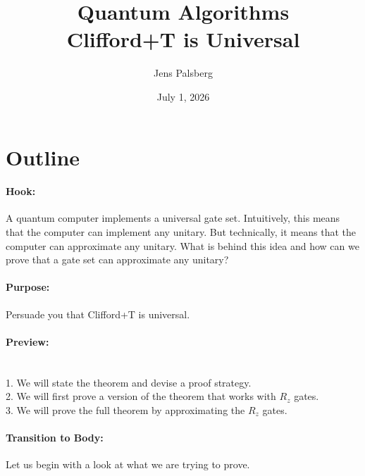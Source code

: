 \documentclass[11pt]{article}
\title{Quantum Algorithms \\
       Clifford+T is Universal}
\author{Jens Palsberg}
\date{July 1, 2026}
\begin{document}
\maketitle


\newpage


\vspace*{-1.2cm}

\section*{Outline}

\paragraph{Hook:} 
A quantum computer implements a universal gate set.
Intuitively, this means that the computer can implement any unitary. 
But technically, it means that the computer can approximate any unitary.
What is behind this idea and how can we prove that 
a gate set can approximate any unitary?

\paragraph{Purpose:} Persuade you that Clifford+T is universal.

\paragraph{Preview:} \mbox{} \\
\hspace*{1cm}
1. We will state the theorem and devise a proof strategy.
\\
\hspace*{1cm}
2. We will first prove a version of the theorem that works with $R_z$ gates.
\\
\hspace*{1cm}
3. We will prove the full theorem by approximating the $R_z$ gates.

\paragraph{Transition to Body:} 
Let us begin with a look at what we are trying to prove.
\end{document}
